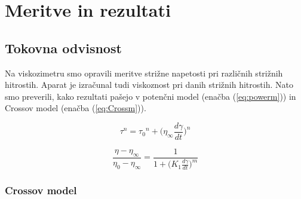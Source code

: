 \documentclass{article}
\begin{document}
%
%

\newpage
\section{Meritve in rezultati}

\subsection{Tokovna odvisnost}
Na viskozimetru smo opravili meritve strižne napetosti pri različnih strižnih hitrostih. Aparat je izračunal tudi viskoznost pri danih strižnih hitrostih. Nato smo preverili, kako rezultati pašejo v potenčni model (enačba (\ref{eq:powerm})) in Crossov model (enačba (\ref{eq:Crossm})).

\begin{equation} \label{eq:powerm}
\tau^n = {\tau_0}^n + \Big(\eta_\infty\frac{d\gamma}{dt}\Big)^n
\end{equation}

\begin{equation} \label{eq:Crossm}
\frac{\eta - \eta_{\infty}}{\eta_0 - \eta_{\infty}} = \frac{1}{1 + \Big(K_1\frac{d\gamma}{dt}\Big)^m}
\end{equation}

\subsubsection{Crossov model}
\end{document}
